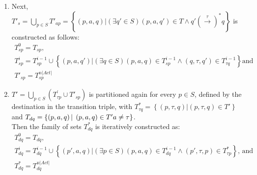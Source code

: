 \begin{enumerate}
\item Next, $T'_{s}=\bigcup_{p\in \mathit{S}}T'_{ap}=\left\{\left(p,a,q\right)|\left(\exists q'\in \mathit{S}\right)\left(p,a,q'\right)\in T\wedge q'\left(\stackrel{\tau}{\rightarrow}\right)^{*}q\right\}$ is constructed as follows:
\begin{equation*}
	\begin{array}{lcl}
		T^{0}_{sp}=T_{sp},\\
		T^{i}_{sp}=T^{i-1}_{sp}\cup \left\{\left(p,a,q'\right)|\left(\exists q\in \mathit{S}\right)\left(p,a,q\right)\in T^{i-1}_{sp}\wedge \left(q,\tau,q'\right)\in T^{i-1}_{\tau q}\right\} \text{and} \\
		T'_{sp}=T^{n|\mathit{Act}|}_{sp}
	\end{array}
\end{equation*}

\item $T'=\bigcup_{p\in \mathit{S}}\left(T^{'}_{\mathit{\tau p}}\cup T'_{sp}\right)$ is partitioned again for every $p\in \mathit{S}$, defined by the destination in the transition triple, with $T^{*}_{\mathit{\tau q}}=\left\{\left(p,\tau,q\right)|\left(p,\tau,q\right)\in T'\right\}$ and $T_{dq}=\left\{\left(p,a,q\right)|\hspace{1mm}\left(p,a,q\right)\in T' a\neq\tau\right\}$.
\\
Then the family of sets ${T^{*}_{dq}}$ is iteratively constructed as:
\begin{equation*}
	\begin{array}{lcl}
		T^{0}_{dq}=T_{dq},\\
		T^{i}_{dq}=T^{i-1}_{dq}\cup\left\{\left(p',a,q\right)|\left(\exists p\in \mathit{S}\right)\left(p,a,q\right)\in T^{i-1}_{dq}\wedge\left(p',\tau,p\right)\in T^{*}_{\tau p}\right\} \text{, and}\\
		T^{*}_{dq}=T^{n|\mathit{Act}|}_{dq}
	\end{array}
\end{equation*}
\end{enumerate}

